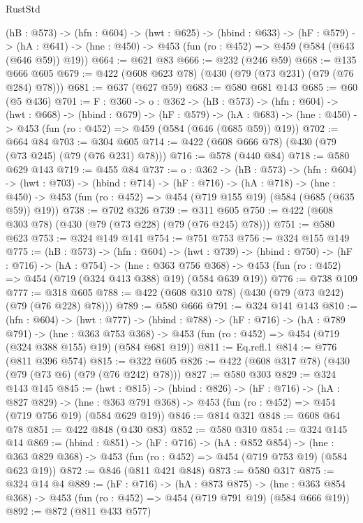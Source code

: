 \begin{lexlean}{RustStd}
\begin{coremodule}
  (hB : @573) ->
  (hfn : @604) ->
  (hwt : @625) ->
  (hbind : @633) ->
  (hF : @579) ->
  (hA : @641) -> (hne : @450) -> @453 (fun (ro : @452) => @459 (@584 (@643 (@646 @59)) @19))
@664 := @621 @83
@666 := @232 (@246 @59)
@668 := @135 @666 @605
@679 := @422 (@608 @623 @78) (@430 (@79 (@73 @231) (@79 (@76 @284) @78)))
@681 := @637 (@627 @59)
@683 := @580 @681 @143
@685 := @60 (@5 @436)
@701 := {F : @360} ->
  {o : @362} ->
  (hB : @573) ->
  (hfn : @604) ->
  (hwt : @668) ->
  (hbind : @679) ->
  (hF : @579) ->
  (hA : @683) -> (hne : @450) -> @453 (fun (ro : @452) => @459 (@584 (@646 (@685 @59)) @19))
@702 := @664 @84
@703 := @304 @605
@714 := @422 (@608 @666 @78) (@430 (@79 (@73 @245) (@79 (@76 @231) @78)))
@716 := @578 (@440 @84)
@718 := @580 @629 @143
@719 := @455 @84
@737 := {o : @362} ->
  (hB : @573) ->
  (hfn : @604) ->
  (hwt : @703) ->
  (hbind : @714) ->
  (hF : @716) ->
  (hA : @718) ->
  (hne : @450) -> @453 (fun (ro : @452) => @454 (@719 @155 @19) (@584 (@685 (@635 @59)) @19))
@738 := @702 @326
@739 := @311 @605
@750 := @422 (@608 @303 @78) (@430 (@79 (@73 @228) (@79 (@76 @245) @78)))
@751 := @580 @623
@753 := @324 @149 @141
@754 := @751 @753
@756 := @324 @155 @149
@775 := (hB : @573) ->
  (hfn : @604) ->
  (hwt : @739) ->
  (hbind : @750) ->
  (hF : @716) ->
  (hA : @754) ->
  (hne : @363 @756 @368) ->
  @453 (fun (ro : @452) => @454 (@719 (@324 @413 @388) @19) (@584 @639 @19))
@776 := @738 @109
@777 := @318 @605
@788 := @422 (@608 @310 @78) (@430 (@79 (@73 @242) (@79 (@76 @228) @78)))
@789 := @580 @666
@791 := @324 @141 @143
@810 := (hfn : @604) ->
  (hwt : @777) ->
  (hbind : @788) ->
  (hF : @716) ->
  (hA : @789 @791) ->
  (hne : @363 @753 @368) ->
  @453 (fun (ro : @452) => @454 (@719 (@324 @388 @155) @19) (@584 @681 @19))
@811 := Eq.refl.{1}
@814 := @776 (@811 @396 @574)
@815 := @322 @605
@826 := @422 (@608 @317 @78) (@430 (@79 (@73 @6) (@79 (@76 @242) @78)))
@827 := @580 @303
@829 := @324 @143 @145
@845 := (hwt : @815) ->
  (hbind : @826) ->
  (hF : @716) ->
  (hA : @827 @829) ->
  (hne : @363 @791 @368) -> @453 (fun (ro : @452) => @454 (@719 @756 @19) (@584 @629 @19))
@846 := @814 @321
@848 := @608 @64 @78
@851 := @422 @848 (@430 @83)
@852 := @580 @310
@854 := @324 @145 @14
@869 := (hbind : @851) ->
  (hF : @716) ->
  (hA : @852 @854) ->
  (hne : @363 @829 @368) -> @453 (fun (ro : @452) => @454 (@719 @753 @19) (@584 @623 @19))
@872 := @846 (@811 @421 @848)
@873 := @580 @317
@875 := @324 @14 @4
@889 := (hF : @716) ->
  (hA : @873 @875) ->
  (hne : @363 @854 @368) -> @453 (fun (ro : @452) => @454 (@719 @791 @19) (@584 @666 @19))
@892 := @872 (@811 @433 @577)

\end{coremodule}
\end{lexlean}
